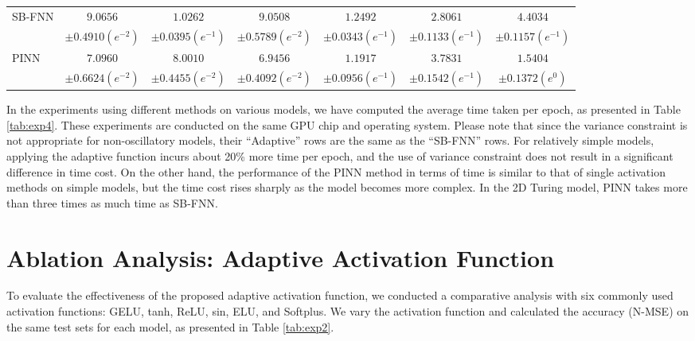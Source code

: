 \begin{table*}[!htb]
\begin{tabular}{ l cccccc }
\multirow{2}{*}{SB-FNN} & $9.0656$ & $1.0262$ & $9.0508$ & $1.2492$ & $2.8061$ & $4.4034$ \\ 
 & $\pm0.4910 (e^{-2})$ & $\pm0.0395 (e^{-1})$ & $\pm0.5789 (e^{-2})$ & $\pm0.0343 (e^{-1})$ & $\pm0.1133 (e^{-1})$ & $\pm0.1157 (e^{-1})$ \\
\multirow{2}{*}{PINN} & $7.0960$ & $8.0010$ & $6.9456$ & $1.1917$ & $3.7831$ & $1.5404$ \\ 
 & $\pm0.6624 (e^{-2})$ & $\pm0.4455 (e^{-2})$ & $\pm0.4092 (e^{-2})$ & $\pm0.0956 (e^{-1})$ & $\pm0.1542 (e^{-1})$ & $\pm0.1372 (e^{0})$ \\
 
\bottomrule
\end{tabular}%
\end{table*}

In the experiments using different methods on various models, we have computed the average time taken per epoch, as presented in Table \ref{tab:exp4}. These experiments are conducted on the same GPU chip and operating system. Please note that since the variance constraint is not appropriate for non-oscillatory models, their ``Adaptive'' rows are the same as the ``SB-FNN'' rows. For relatively simple models, applying the adaptive function incurs about 20\% more time per epoch, and the use of variance constraint does not result in a significant difference in time cost. On the other hand, the performance of the PINN method in terms of time is similar to that of single activation methods on simple models, but the time cost rises sharply as the model becomes more complex. In the 2D Turing model, PINN takes more than three times as much time as SB-FNN.

\section{Ablation Analysis: Adaptive Activation Function}

To evaluate the effectiveness of the proposed adaptive activation function, we conducted a comparative analysis with six commonly used activation functions: GELU, tanh, ReLU, sin, ELU, and Softplus. We vary the activation function and calculated the accuracy (N-MSE) on the same test sets for each model, as presented in Table \ref{tab:exp2}.


